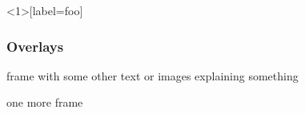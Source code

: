 \documentclass{beamer}
\begin{document}
\begin{frame}<1>[label=foo]
\frametitle{Overlays}


\end{frame}

\begin{frame}
frame with some other text or images explaining something
\end{frame}


\begin{frame}
one more frame
\end{frame}

\end{document}
